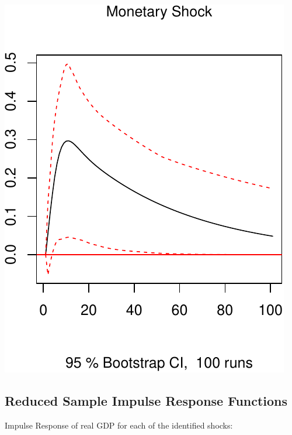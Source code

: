 \documentclass[11pt,preprint, authoryear]{elsarticle}
\numberwithin{equation}{section}
\numberwithin{figure}{section}
\numberwithin{table}{section}
\begin{document}
\includegraphics{TS_proj_files/figure-latex/unnamed-chunk-35-3.pdf}

\hypertarget{reduced-sample-impulse-response-functions}{%
\subsection{Reduced Sample Impulse Response
Functions}\label{reduced-sample-impulse-response-functions}}

Impulse Response of real GDP for each of the identified shocks:
\end{document}
